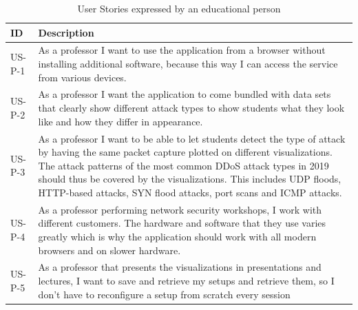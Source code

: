 \begin{table}[]
\centering
\begin{tabular}{|p{1.6cm}|p{12cm}|}
\hline
\textbf{ID} & \textbf{Description} \\ \hline

US-P-1         & As a professor I want to use the application from a browser without installing additional software, because this way I can access the service from various devices.\\ \hline
US-P-2        & As a professor I want the application to come bundled with data sets that clearly show different attack types to show students what they look like and how they differ in appearance.\\ \hline
US-P-3        & As a professor I want to be able to let students detect the type of attack by having the same packet capture plotted on different visualizations. The attack patterns of the most common DDoS attack types in 2019 should thus be covered by the visualizations\footnotemark. This includes UDP floods, HTTP-based attacks, SYN flood attacks, port scans and ICMP attacks.\\ \hline
US-P-4       & As a professor performing network security workshops, I work with different customers. The hardware and software that they use varies greatly which is why the application should work with all modern browsers and on slower hardware.\\ \hline
US-P-5      & As a professor that presents the visualizations in presentations and lectures, I want to save and retrieve my setups and retrieve them, so I don't have to reconfigure a setup from scratch every session\\ \hline

\end{tabular}
\caption{User Stories expressed by an educational person}
\label{table:us-professor}
\end{table} 



